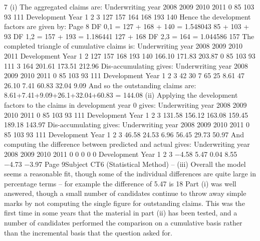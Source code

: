 7
(i)
The aggregated claims are:
Underwriting year
2008
2009
2010
2011
0
85
103
93
111
Development Year
1
2
3
127 157 164
168 193
140
Hence the development factors are given by:
Page 8
DF 0,1 = 127 + 168 + 140
= 1.548043
85 + 103 + 93
DF 1,2 = 157 + 193
= 1.186441
127 + 168
DF 2,3 = 164
= 1.044586
157%
The completed triangle of cumulative claims is:
Underwriting
year
2008
2009
2010
2011
Development Year
1
2
127
157
168
193
140
166.10
171.83
203.87
0
85
103
93
111
3
164
201.61
173.51
212.96
Dis-accumulating gives:
Underwriting year
2008
2009
2010
2011
0
85
103
93
111
Development Year
1
2
3
42
30
7
65
25
8.61
47
26.10 7.41
60.83 32.04 9.09
And so the outstanding claims are:
8.61+7.41+9.09+26.1+32.04+60.83 = 144.08
(ii)
Applying the development factors to the claims in development year 0 gives:
Underwriting year
2008
2009
2010
2011
0
85
103
93
111
Development Year
1
2
3
131.58 156.12 163.08
159.45 189.18
143.97
Dis-accumulating gives:
Underwriting year
2008
2009
2010
2011
0
85
103
93
111
Development Year
1
2
3
46.58 24.53 6.96
56.45 29.73
50.97
And computing the difference between predicted and actual gives:
Underwriting year
2008
2009
2010
2011
0
0
0
0
0
Development Year
1
2
3
−4.58
5.47 0.04
8.55 −4.73
−3.97
Page 9Subject CT6 (Statistical Method) – %
(iii)
Overall the model seems a reasonable fit, though some of the individual
differences are quite large in percentage terms – for example the difference of
5.47 is 18%
Part (i) was well answered, though a small number of candidates continue to throw away
simple marks by not computing the single figure for outstanding claims. This was the first
time in some years that the material in part (ii) has been tested, and a number of candidates
performed the comparison on a cumulative basis rather than the incremental basis that the
question asked for.
